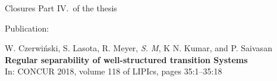 \documentclass[../talk.tex]{subfiles}
\begin{document}
\begin{frame}{Closures}
    Part IV.~of the thesis

    \vspace*{2.3em}

    \alert{Publication:}

    \vspace*{1em}

    W. Czerwiński, S. Lasota, R. Meyer, \textit{S. M}, K N. Kumar, and P. Saivasan
    \\
    \textbf{Regular separability of well-structured transition Systems}
    \\
    In: CONCUR 2018, volume 118 of LIPIcs, pages 35:1--35:18
\end{frame}
\end{document}
